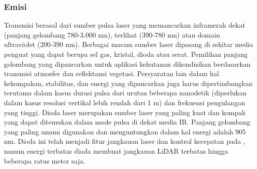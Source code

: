     \subsubsection{Emisi \lidar}
    \label{subsec: emisi}
    Transmisi berasal dari sumber pulsa laser yang memancarkan inframerah dekat (panjang gelombang 780-3.000 nm), terlihat (390-780 nm) atau domain ultraviolet (200-390 nm). Berbagai macam sumber laser dipasang di sekitar media penguat yang dapat berupa sel gas, kristal, dioda atau serat. Pemilihan panjang gelombang yang dipancarkan untuk aplikasi kehutanan dikondisikan berdasarkan transmisi atmosfer dan reflektansi vegetasi. Persyaratan lain dalam hal kekompakan, stabilitas, dan energi yang dipancarkan juga harus dipertimbangkan terutama dalam kasus durasi pulsa dari urutan beberapa nanodetik (diperlukan dalam kasus resolusi vertikal lebih rendah dari 1 m) dan frekuensi pengulangan yang tinggi.
    Dioda laser merupakan sumber laser yang paling kuat dan kompak yang dapat ditemukan dalam mode pulsa di dekat media IR. Panjang gelombang yang paling umum digunakan dan menguntungkan dalam hal energi adalah 905 nm. Dioda ini telah menjadi fitur jangkauan laser dan kontrol kecepatan pada \lidar, namun energi terbatas dioda membuat jangkauan LiDAR terbatas hingga beberapa ratus meter saja.

